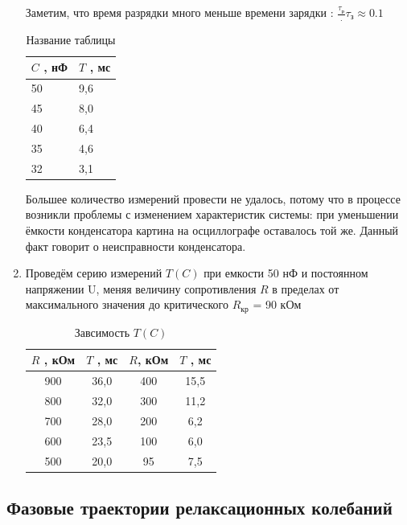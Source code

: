 \documentclass[a4paper,12pt]{article} %
\begin{document}
\begin{enumerate}
Заметим, что время разрядки много меньше времени зарядки : $\frac{\tau_{р}}.{\tau_{з}}\approx 0.1$


\begin{table}[H]
\centering
\begin{tabular}{|p{3cm}|p{3cm}|}
         \hline
$C$ , нФ & $T$ , мс \\ \hline\hline
50 & 9,6 \\ \hline
45 & 8,0 \\ \hline
40 & 6,4 \\ \hline
35 & 4,6 \\ \hline
32 & 3,1 \\ \hline
\end{tabular}
    \caption{Название таблицы}
\end{table}

Большее количество измерений провести не удалось, потому что в процессе возникли проблемы с изменением характеристик системы: при уменьшении ёмкости конденсатора картина на осциллографе оставалось той же. Данный факт говорит о неисправности конденсатора.

\item  Проведём серию измерений $T(C)$ при емкости 50 нФ и постоянном напряжении U, меняя величину сопротивления $R$ в пределах от максимального значения до критического $R_{кр}$ = 90 кОм


\begin{table}[h]
    \centering
    \begin{tabular}{|c|c|c|c|}
        \hline
        $R$ , кОм & $T$ , мс & $R$, кОм & $T$ , мс\\ \hline\hline
        
        900 & 36,0 & 400 & 15,5 \\ \hline
        800 & 32,0 & 300 & 11,2 \\ \hline
        700 & 28,0 & 200 & 6,2 \\ \hline
        600 & 23,5 & 100 & 6,0 \\ \hline
        500 & 20,0 & 95 & 7,5 \\ \hline
    \end{tabular}
    \caption{Завсимость $T(C)$ }
\end{table}

\end{enumerate}

\subsection{Фазовые траектории релаксационных колебаний}
\end{document}
